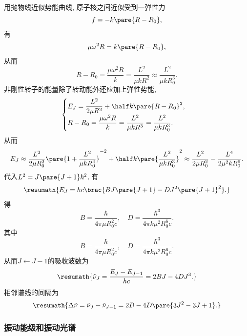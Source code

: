 \documentclass[hidelinks]{ctexart}
\begin{document}
用抛物线近似势能曲线, 原子核之间近似受到一弹性力
\[ f = -k\pare{R-R_0}, \]
有
\[ \mu \omega^2 R = k\pare{R-R_0}, \]
从而
\[ R-R_0 = \frac{\mu \omega^2 R}{k} = \frac{L^2}{\mu k R^2} \approx \frac{L^2}{\mu k R_0^3}. \]
非刚性转子的能量除了转动能外还应加上弹性势能,
\[ \begin{cases}
    \displaystyle E_J = \frac{L^2}{2\mu R^2} + \half k\pare{R-R_0}^2, \\[.5em]
    \displaystyle R-R_0 = \frac{\mu \omega^2 R}{k} = \frac{L^2}{\mu kR^3} = \frac{L^2}{\mu k R_0^3}.
\end{cases} \]
从而
\[ E_J \approx \frac{L^2}{2\mu R_0^2}\pare{1+\frac{L^2}{\mu kR_0^4}}^{-2} + \half k\pare{\frac{L^2}{\mu kR_0^3}}^2 \approx \frac{L^2}{2\mu R_0^2} - \frac{L^4}{2\mu^2 k R_0^6}. \]
代入$L^2 = J\pare{J+1}\hbar^2$, 有
\[ \resumath{E_J = hc \brac{BJ\pare{J+1} - DJ^2\pare{J+1}^2}.} \]
得
\[ B = \frac{\hbar}{4\pi\mu R_0^2 c},\quad D = \frac{\hbar^3}{4\pi k \mu^2 R_0^6 c}. \]
其中
\[ B = \frac{\hbar}{4\pi \mu R_0^2 c},\quad D = \frac{\hbar^3}{4\pi k\mu^2 R_0^6 c}. \]
从而$J\leftarrow J-1$的吸收波数为
\[ \resumath{\tilde{\nu}_J = \frac{E_J - E_{J-1}}{hc} = 2BJ - 4DJ^3.} \]
相邻谱线的间隔为
\[ \resumath{\Delta\tilde{\nu} = \tilde{\nu}_J - \tilde{\nu}_{J-1} = 2B - 4D\pare{3J^2 - 3J+1}.} \]



\subsubsection{振动能级和振动光谱} %
\label{ssub:振动能级和振动光谱}
\end{document}

